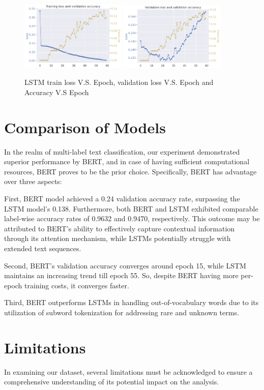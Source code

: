 \documentclass{article}
\begin{document}
\begin{figure}[h!]
    \centering
    \includegraphics[width = 0.45\textwidth]{img/LSTM_train_plot.png}
    \includegraphics[width = 0.45\textwidth]{img/LSTM_val_plot.png}
    \caption{LSTM train loss V.S. Epoch, validation loss V.S. Epoch and Accuracy V.S Epoch}
    \label{fig:lstm_plot}
\end{figure}
\section{Comparison of Models}
In the realm of multi-label text classification, our experiment demonstrated superior performance by BERT, and in case of having sufficient computational resources, BERT proves to be the prior choice. Specifically, BERT has advantage over three aspects:

First, BERT model achieved a 0.24 validation accuracy rate, surpassing the LSTM model’s 0.138. Furthermore, both BERT and LSTM exhibited comparable label-wise accuracy rates of 0.9632 and 0.9470, respectively. This outcome may be attributed to BERT’s ability to effectively capture contextual information through its attention mechanism, while LSTMs potentially struggle with extended text sequences. 

Second, BERT's validation accuracy converges around epoch 15, while LSTM maintains an increasing trend till epoch 55. So, despite BERT having more per-epoch training costs, it converges faster.

Third, BERT outperforms LSTMs in handling out-of-vocabulary words due to its utilization of subword tokenization for addressing rare and unknown terms.
\section{Limitations}
In examining our dataset, several limitations must be acknowledged to ensure a comprehensive understanding of its potential impact on the analysis. 
\end{document}
